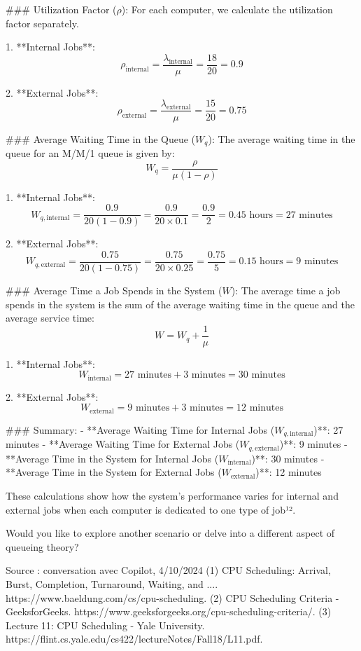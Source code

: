 \documentclass[a4paper12pt]{article}
\begin{document}
### Utilization Factor (\(\rho\)):
For each computer, we calculate the utilization factor separately.

1. **Internal Jobs**:
   $$\rho_{\text{internal}} = \frac{\lambda_{\text{internal}}}{\mu} = \frac{18}{20} = 0.9$$

2. **External Jobs**:
   $$\rho_{\text{external}} = \frac{\lambda_{\text{external}}}{\mu} = \frac{15}{20} = 0.75$$

### Average Waiting Time in the Queue (\(W_q\)):
The average waiting time in the queue for an M/M/1 queue is given by:
$$W_q = \frac{\rho}{\mu (1 - \rho)}$$

1. **Internal Jobs**:
   $$W_{q,\text{internal}} = \frac{0.9}{20 (1 - 0.9)} = \frac{0.9}{20 \times 0.1} = \frac{0.9}{2} = 0.45 \text{ hours} = 27 \text{ minutes}$$

2. **External Jobs**:
   $$W_{q,\text{external}} = \frac{0.75}{20 (1 - 0.75)} = \frac{0.75}{20 \times 0.25} = \frac{0.75}{5} = 0.15 \text{ hours} = 9 \text{ minutes}$$

### Average Time a Job Spends in the System (\(W\)):
The average time a job spends in the system is the sum of the average waiting time in the queue and the average service time:
$$W = W_q + \frac{1}{\mu}$$

1. **Internal Jobs**:
   $$W_{\text{internal}} = 27 \text{ minutes} + 3 \text{ minutes} = 30 \text{ minutes}$$

2. **External Jobs**:
   $$W_{\text{external}} = 9 \text{ minutes} + 3 \text{ minutes} = 12 \text{ minutes}$$

### Summary:
- **Average Waiting Time for Internal Jobs (\(W_{q,\text{internal}}\))**: 27 minutes
- **Average Waiting Time for External Jobs (\(W_{q,\text{external}}\))**: 9 minutes
- **Average Time in the System for Internal Jobs (\(W_{\text{internal}}\))**: 30 minutes
- **Average Time in the System for External Jobs (\(W_{\text{external}}\))**: 12 minutes

These calculations show how the system's performance varies for internal and external jobs when each computer is dedicated to one type of job¹².

Would you like to explore another scenario or delve into a different aspect of queueing theory?

Source : conversation avec Copilot, 4/10/2024
(1) CPU Scheduling: Arrival, Burst, Completion, Turnaround, Waiting, and .... https://www.baeldung.com/cs/cpu-scheduling.
(2) CPU Scheduling Criteria - GeeksforGeeks. https://www.geeksforgeeks.org/cpu-scheduling-criteria/.
(3) Lecture 11: CPU Scheduling - Yale University. https://flint.cs.yale.edu/cs422/lectureNotes/Fall18/L11.pdf.
\end{document}
